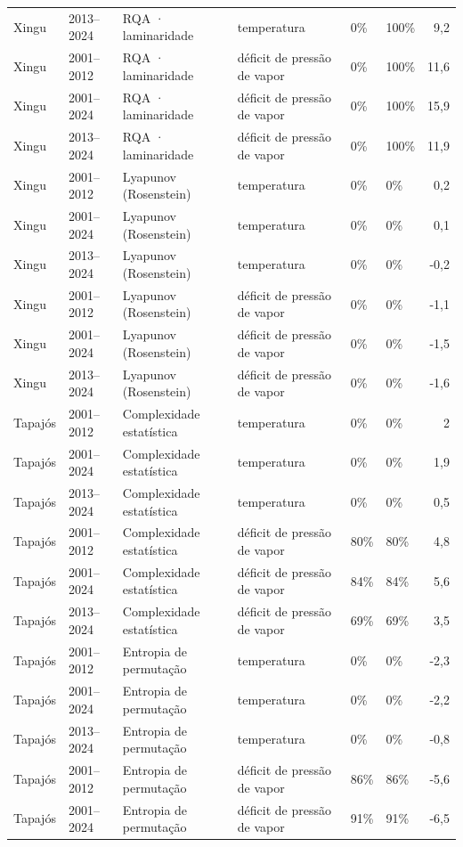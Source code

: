 \begin{table}
\begin{tabular}{llllllr}
Xingu & 2013–2024 & RQA · laminaridade & temperatura & 0\% & 100\% & 9,2 \\
Xingu & 2001–2012 & RQA · laminaridade & déficit de pressão de vapor & 0\% & 100\% & 11,6 \\
Xingu & 2001–2024 & RQA · laminaridade & déficit de pressão de vapor & 0\% & 100\% & 15,9 \\
Xingu & 2013–2024 & RQA · laminaridade & déficit de pressão de vapor & 0\% & 100\% & 11,9 \\
Xingu & 2001–2012 & Lyapunov (Rosenstein) & temperatura & 0\% & 0\% & 0,2 \\
Xingu & 2001–2024 & Lyapunov (Rosenstein) & temperatura & 0\% & 0\% & 0,1 \\
Xingu & 2013–2024 & Lyapunov (Rosenstein) & temperatura & 0\% & 0\% & -0,2 \\
Xingu & 2001–2012 & Lyapunov (Rosenstein) & déficit de pressão de vapor & 0\% & 0\% & -1,1 \\
Xingu & 2001–2024 & Lyapunov (Rosenstein) & déficit de pressão de vapor & 0\% & 0\% & -1,5 \\
Xingu & 2013–2024 & Lyapunov (Rosenstein) & déficit de pressão de vapor & 0\% & 0\% & -1,6 \\
Tapajós & 2001–2012 & Complexidade estatística & temperatura & 0\% & 0\% & 2 \\
Tapajós & 2001–2024 & Complexidade estatística & temperatura & 0\% & 0\% & 1,9 \\
Tapajós & 2013–2024 & Complexidade estatística & temperatura & 0\% & 0\% & 0,5 \\
Tapajós & 2001–2012 & Complexidade estatística & déficit de pressão de vapor & 80\% & 80\% & 4,8 \\
Tapajós & 2001–2024 & Complexidade estatística & déficit de pressão de vapor & 84\% & 84\% & 5,6 \\
Tapajós & 2013–2024 & Complexidade estatística & déficit de pressão de vapor & 69\% & 69\% & 3,5 \\
Tapajós & 2001–2012 & Entropia de permutação & temperatura & 0\% & 0\% & -2,3 \\
Tapajós & 2001–2024 & Entropia de permutação & temperatura & 0\% & 0\% & -2,2 \\
Tapajós & 2013–2024 & Entropia de permutação & temperatura & 0\% & 0\% & -0,8 \\
Tapajós & 2001–2012 & Entropia de permutação & déficit de pressão de vapor & 86\% & 86\% & -5,6 \\
Tapajós & 2001–2024 & Entropia de permutação & déficit de pressão de vapor & 91\% & 91\% & -6,5 \\

\end{tabular}
\end{table}
